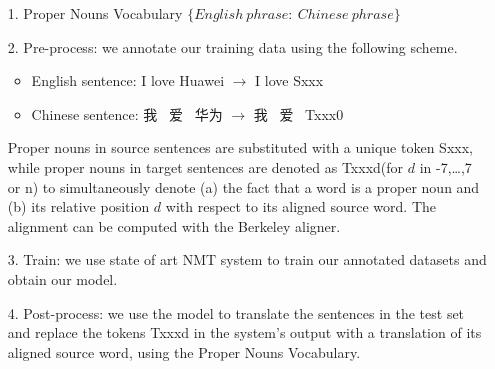 \documentclass{article}
\begin{document}
\begin{itemize}

\item[1. ] Proper Nouns Vocabulary $\{English~ phrase:~ Chinese~ phrase\}$ 

\item[2. ] Pre-process: we annotate our training data using the following scheme.
\begin{itemize}
\item English sentence: I love Huawei $\rightarrow$ I love Sxxx
\item Chinese sentence: 我~ 爱 ~华为 $\rightarrow$ 我~ 爱~ Txxx0
\end{itemize}
Proper nouns in source sentences are substituted with a unique token Sxxx, while proper nouns in target sentences are denoted as Txxxd(for $d$ in -7,\dots,7 or n) to simultaneously denote (a) the fact that a word is a proper noun and (b) its relative position $d$ with respect to its aligned source word. The alignment can be computed with the Berkeley aligner.

\item[3. ] Train: we use state of art NMT system to train our annotated datasets and obtain our model. 

\item[4. ] Post-process: we use the model to translate the sentences in the test set and replace the tokens Txxxd in the system's output with a translation of its aligned source word, using the Proper Nouns Vocabulary. 
\end{itemize}
\end{document}
